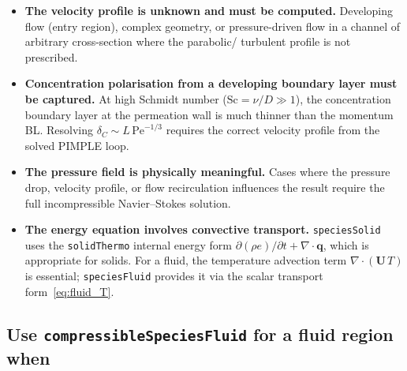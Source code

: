 \documentclass[11pt,a4paper]{article}
\begin{document}
\begin{itemize}[itemsep=4pt]

  \item \textbf{The velocity profile is unknown and must be computed.}
        Developing flow (entry region), complex geometry, or pressure-driven
        flow in a channel of arbitrary cross-section where the parabolic/
        turbulent profile is not prescribed.

  \item \textbf{Concentration polarisation from a developing boundary layer
        must be captured.}
        At high Schmidt number ($\mathrm{Sc} = \nu/D \gg 1$), the concentration
        boundary layer at the permeation wall is much thinner than the momentum
        BL.  Resolving $\delta_C \sim L\,\mathrm{Pe}^{-1/3}$ requires the
        correct velocity profile from the solved PIMPLE loop.

  \item \textbf{The pressure field is physically meaningful.}
        Cases where the pressure drop, velocity profile, or flow recirculation
        influences the result require the full incompressible Navier--Stokes
        solution.

  \item \textbf{The energy equation involves convective transport.}
        \texttt{speciesSolid} uses the \texttt{solidThermo} internal energy
        form $\partial(\rho e)/\partial t + \nabla\cdot\mathbf{q}$, which is
        appropriate for solids.  For a fluid, the temperature advection term
        $\nabla\cdot(\mathbf{U}\,T)$ is essential; \texttt{speciesFluid}
        provides it via the scalar transport form~\eqref{eq:fluid_T}.

\end{itemize}

\subsection{Use \texttt{compressibleSpeciesFluid} for a fluid region when}
\end{document}

